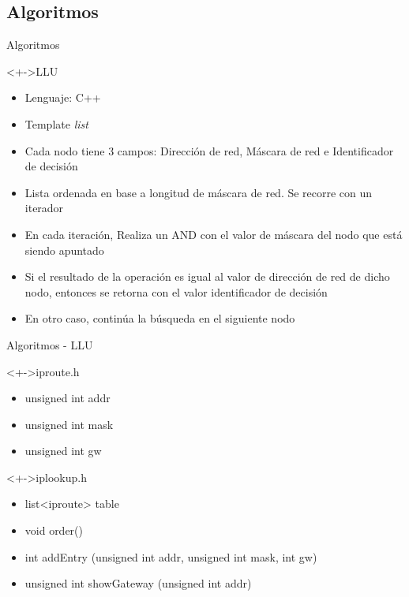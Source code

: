 \documentclass[xcolor=dvipsnames]{beamer}
\begin{document}
\subsection{Algoritmos}
\begin{frame}{Algoritmos}
\begin{block}<+->{LLU}   
    \begin{itemize}
      \scriptsize
     	\item Lenguaje: C++
     	\item Template \emph{list}
     	\item Cada nodo tiene 3 campos: Dirección de red, Máscara de red e Identificador de decisión
	\item Lista ordenada en base a longitud de máscara de red. Se recorre con un iterador
	\item En cada iteración, Realiza un AND con el valor de máscara del nodo que está siendo apuntado
	\item Si el resultado de la operación es igual al valor de dirección de red de dicho nodo, entonces se retorna con el valor identificador de decisión
	\item En otro caso, continúa la búsqueda en el siguiente nodo
    \end{itemize}
  \end{block}
\end{frame}

\begin{frame}{Algoritmos - LLU}
\begin{block}<+->{iproute.h}   
    \begin{itemize}
      \scriptsize
     	\item unsigned int addr
     	\item unsigned int mask
     	\item unsigned int gw
    \end{itemize}
  \end{block}

\begin{block}<+->{iplookup.h}   
    \begin{itemize}
      \scriptsize
     	\item list<iproute> table
	\item void order()
	\item int addEntry (unsigned int addr, unsigned int mask, int gw)
	\item unsigned int showGateway (unsigned int addr)
    \end{itemize}
  \end{block}
\end{frame}
	
\end{document}
